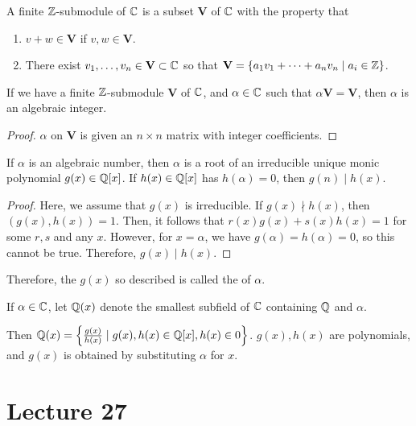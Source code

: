 \documentclass{article}
\begin{document}
\begin{definition}
	A finite $\mathbb Z$-submodule of $\mathbb C$ is a subset $\mathbf{V}$ of $\mathbb C$ with the property that 
	\begin{enumerate} 
		\item $v + w \in \mathbf{V}$ if $v, w \in \mathbf{V}$.
		\item There exist $v_1, \ldots, v_n \in \mathbf{V} \subset \mathbb C$ so that $\mathbf{V} = \{a_1v_1 + \cdots + a_nv_n \mid a_i \in \mathbb Z\}$.
	\end{enumerate}
\end{definition}

\begin{lemma}
	If we have a finite $\mathbb Z$-submodule $\mathbf{V}$ of $\mathbb C$, and $\alpha \in \mathbb C$ such that $\alpha \mathbf{V} = \mathbf{V}$, then $\alpha$ is an algebraic integer.
\end{lemma}

\begin{proof} 
	$\alpha$ on $\mathbf{V}$ is given an $n \times n$ matrix with integer coefficients.
\end{proof}

\begin{proposition}
	If $\alpha$ is an algebraic number, then $\alpha$ is a root of an irreducible unique monic polynomial $g(x) \in \mathbb Q[x]$. If $h(x) \in \mathbb Q[x]$ has $h(\alpha) = 0$, then $g(n) \mid h(x)$. 
\end{proposition}

\begin{proof}
	Here, we assume that $g(x)$ is irreducible. If $g(x) \nmid h(x)$, then $(g(x), h(x)) = 1$. Then, it follows that $r(x)g(x) + s(x)h(x) = 1$ for some $r, s$ and any $x$. However, for $x = \alpha$, we have $g(\alpha) = h(\alpha) = 0$, so this cannot be true. Therefore, $g(x) \mid h(x)$. 
\end{proof}

Therefore, the $g(x)$ so described is called the  of $\alpha$.

\begin{definition} 
	If $\alpha \in \mathbb C$, let $\mathbb Q(x)$ denote the smallest subfield of $\mathbb C$ containing $\mathbb Q$ and $\alpha$.
\end{definition}

Then $\mathbb Q(x) = \left\{ \frac{g(x)}{h(x)} \mid g(x), h(x) \in \mathbb Q[x], h(x) \in 0\right\}$. $g(x), h(x)$ are polynomials, and $g(x)$ is obtained by substituting $\alpha$ for $x$.

\section{Lecture 27} 
\end{document}
